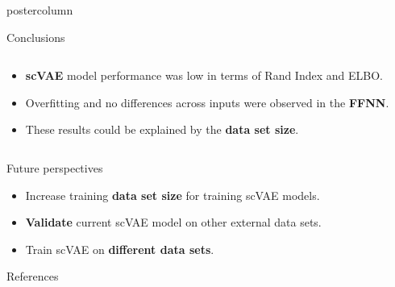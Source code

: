 \documentclass[final,hyperref={pdfpagelabels=false}]{beamer}
\begin{document}
\begin{frame}
\begin{columns}
\begin{column}{.49\paperwidth}
\begin{beamercolorbox}[center,wd=\textwidth]{postercolumn}
\begin{minipage}[T]{.99\textwidth}
{%
\begin{block}{Conclusions}

\begin{columns}
\begin{column}{1\textwidth}
\begin{minipage}[t]{.95\textwidth}

\vspace{0.8cm}

\begin{itemize}
    \item \small{\textbf{scVAE} model performance was low in terms of  Rand Index and ELBO.}
    \vspace{0.3cm}
    \item \small{ Overfitting and no differences across inputs were observed in the \textbf{FFNN}.}
    \vspace{0.3cm}
    \item \small{These results could be explained by the \textbf{data set size}.}
\end{itemize}

\vspace{0.8cm}
\end{minipage}

\end{column}
\end{columns}
\end{block}	

\vfill
\begin{block}{Future perspectives}
\centering
\vspace{0.5cm}
\small{
\begin{itemize}
    \item \small{ Increase training \textbf{data set size} for training scVAE models. }
    \vspace{0.3cm}
    \item \small{ \textbf{Validate} current scVAE model on other external data sets.}
    \vspace{0.3cm}
    \item \small{Train scVAE on \textbf{different data sets}.}
\end{itemize}
}
\vspace{0.8cm}

\end{block}
\vfill
\begin{block}{References}

{\footnotesize
	

}			
\end{block}
\vfill

}
\end{minipage}
\end{beamercolorbox}
\end{column}
\end{columns}
\end{frame}
\end{document}

